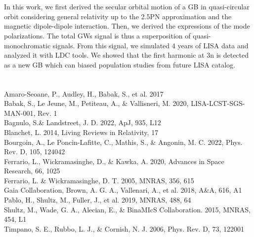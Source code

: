 \documentclass[a4paper,10.5pt]{article}
\begin{document}
\section{}
In this work, we first derived the secular orbital motion of a GB in quasi-circular orbit considering general relativity up to the 2.5PN approximation and the magnetic dipole-dipole interaction. Then, we derived the expressions of the mode polarizations. The total GWs signal is thus a superposition of quasi-monochromatic signals. From this signal, we simulated 4 years of LISA data and analyzed it with LDC tools. We showed that the first harmonic at 3n is detected as a new GB which can biased population studies from future LISA catalog.

\thispagestyle{empty}
\section*{}
Amaro-Seoane, P., Audley, H., Babak, S., et al. 2017
\\
Babak, S., Le Jeune, M., Petiteau, A., \& Vallisneri, M. 2020, LISA-LCST-SGS-MAN-001, Rev. 1
\\
Bagnulo, S.\& Landstreet, J. D. 2022, ApJ, 935, L12
\\
Blanchet, L. 2014, Living Reviews in Relativity, 17
\\
Bourgoin, A., Le Poncin-Lafitte, C., Mathis, S., \& Angonin, M. C. 2022, Phys. Rev. D, 105, 124042
\\
Ferrario, L., Wickramasinghe, D., \& Kawka, A. 2020, Advances in Space Research, 66, 1025
\\
Ferrario, L. \& Wickramasinghe, D. T. 2005, MNRAS, 356, 615
\\
Gaia Collaboration, Brown, A. G. A., Vallenari, A., et al. 2018, A\&A, 616, A1
\\
Pablo, H., Shultz, M., Fuller, J., et al. 2019, MNRAS, 488, 64
\\
Shultz, M., Wade, G. A., Alecian, E., \& BinaMIcS Collaboration. 2015, MNRAS, 454, L1
\\
Timpano, S. E., Rubbo, L. J., \& Cornish, N. J. 2006, Phys. Rev. D, 73, 122001 
\end{document}
